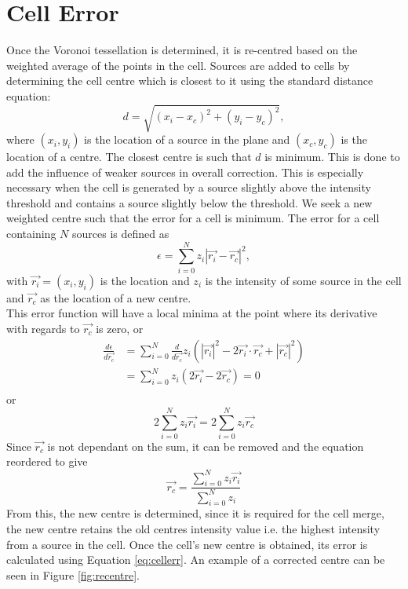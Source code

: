 \section{Cell Error}
Once the Voronoi tessellation is determined, it is re-centred based on the weighted average of the points in the cell. Sources are added to cells by determining the cell centre which is closest to it using the standard distance equation:
\begin{equation}
d = \sqrt{(x_i - x_c)^2 + (y_i - y_c)^2},
\end{equation}
where $(x_i,y_i)$ is the location of a source in the plane and $(x_c,y_c)$ is the location of a centre. The closest centre is such that $d$ is minimum. This is done to add the influence of weaker sources in overall correction. This is especially necessary when the cell is generated by a source slightly above the intensity threshold and contains a source slightly below the threshold. We seek a new weighted centre such that the error for a cell is minimum. The error for a cell containing $N$ sources is defined as
\begin{equation} \label{eq:cellerr}
	\epsilon = \sum^N_{i=0} z_i|\vec{r_i} - \vec{r_c}|^2,
\end{equation}
with $\vec{r_i} = (x_i,y_i)$ is the location and $z_i$ is the intensity of some source in the cell and $\vec{r_c}$ as the location of a new centre. 
\\
This error function will have a local minima at the point where its derivative with regards to $\vec{r_c}$ is zero, or
\begin{align*}
	\frac{d\epsilon}{d\vec{r_c}} &= \sum^N_{i=0} \frac{d}{d\vec{r_c}}z_i(|\vec{r_i}|^2 -2\vec{r_i}\cdot\vec{r_c} + |\vec{r_c}|^2) \\
	&= \sum^N_{i=0} z_i(2\vec{r_i} - 2\vec{r_c}) = 0 \\
\end{align*}
or
\begin{equation*}
	2\sum^N_{i=0} z_i\vec{r_i} = 2\sum^N_{i=0}z_i\vec{r_c}
\end{equation*}
Since $\vec{r_c}$ is not dependant on the sum, it can be removed and the equation reordered to give
\begin{equation}
	\vec{r_c} = \frac{\sum^N_{i=0} z_i\vec{r_i}}{\sum^N_{i=0}z_i}
\end{equation}
From this, the new centre is determined, since it is required for the cell merge, the new centre retains the old centres intensity value i.e. the highest intensity from a source in the cell. Once the cell's new centre is obtained, its error is calculated using Equation \ref{eq:cellerr}. An example of a corrected centre can be seen in Figure \ref{fig:recentre}.
